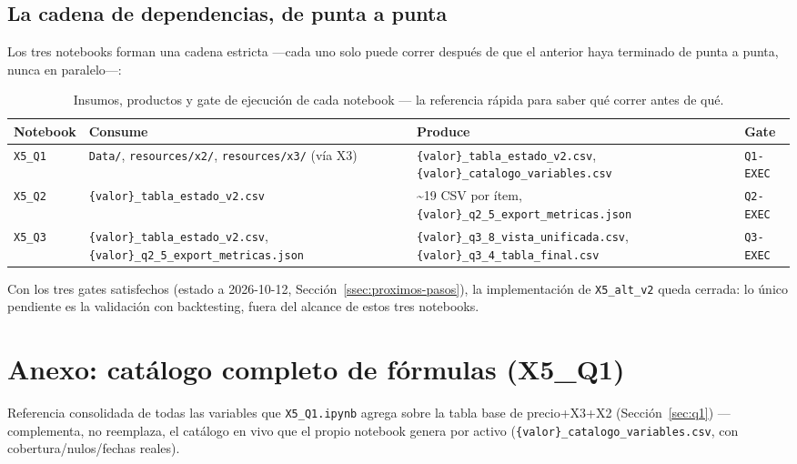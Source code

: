 \documentclass[11pt,a4paper]{article}
\newcommand{\code}[1]{\texttt{\small #1}}
\begin{document}
\subsection*{La cadena de dependencias, de punta a punta}

Los tres notebooks forman una cadena estricta —cada uno solo puede correr después de que
el anterior haya terminado de punta a punta, nunca en paralelo—:

\begin{table}[h]
\centering
\small
\begin{tabularx}{\linewidth}{@{}l X X l@{}}
\toprule
\textbf{Notebook} & \textbf{Consume} & \textbf{Produce} & \textbf{Gate} \\
\midrule
\code{X5\_Q1} & \code{Data/}, \code{resources/x2/}, \code{resources/x3/} (vía X3) &
  \code{\{valor\}\_tabla\_estado\_v2.csv}, \code{\{valor\}\_catalogo\_variables.csv} &
  \code{Q1-EXEC} \\
\code{X5\_Q2} & \code{\{valor\}\_tabla\_estado\_v2.csv} &
  \textasciitilde19 CSV por ítem, \code{\{valor\}\_q2\_5\_export\_metricas.json} &
  \code{Q2-EXEC} \\
\code{X5\_Q3} & \code{\{valor\}\_tabla\_estado\_v2.csv},
  \code{\{valor\}\_q2\_5\_export\_metricas.json} &
  \code{\{valor\}\_q3\_8\_vista\_unificada.csv}, \code{\{valor\}\_q3\_4\_tabla\_final.csv} &
  \code{Q3-EXEC} \\
\bottomrule
\end{tabularx}
\caption{Insumos, productos y gate de ejecución de cada notebook — la referencia rápida
para saber qué correr antes de qué.}
\end{table}

Con los tres gates satisfechos (estado a 2026-10-12, Sección~\ref{ssec:proximos-pasos}),
la implementación de \code{X5\_alt\_v2} queda cerrada: lo único pendiente es la
validación con backtesting, fuera del alcance de estos tres notebooks.

\appendix
\section*{Anexo: catálogo completo de fórmulas (X5\_Q1)}

Referencia consolidada de todas las variables que \code{X5\_Q1.ipynb} agrega sobre la
tabla base de precio+X3+X2 (Sección~\ref{sec:q1}) — complementa, no reemplaza, el catálogo
en vivo que el propio notebook genera por activo
(\code{\{valor\}\_catalogo\_variables.csv}, con cobertura/nulos/fechas reales).
\end{document}
